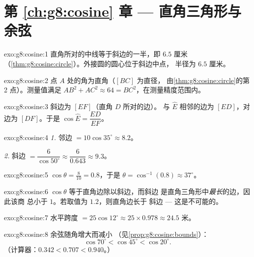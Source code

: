\section*{第 \ref{ch:g8:cosine} 章 --- 直角三角形与余弦}

\begin{solution}{exo:g8:cosine:1}
直角所对的中线等于斜边的一半，即 $6.5$ 厘米
（\cref{thm:g8:cosine:circle}）。外接圆的圆心位于斜边中点，
半径为 $6.5$ 厘米。
\end{solution}

\begin{solution}{exo:g8:cosine:2}
点 $A$ 处的角为直角（$[BC]$ 为直径，
由\cref{thm:g8:cosine:circle}的第 2 点）。测量值满足
$AB^2 + AC^2 \approx 64 = BC^2$，在测量精度范围内。
\end{solution}

\begin{solution}{exo:g8:cosine:3}
斜边为 $[EF]$（直角 $D$ 所对的边）。
与 $\widehat E$ 相邻的边为 $[ED]$，对边为 $[DF]$。于是
$\cos\widehat E = \dfrac{ED}{EF}$。
\end{solution}

\begin{solution}{exo:g8:cosine:4}
\emph{1.} 邻边 $= 10 \cos 35^\circ \approx 8.2$。

\emph{2.} 斜边 $= \dfrac{6}{\cos 50^\circ} \approx
\dfrac{6}{0.643} \approx 9.3$。
\end{solution}

\begin{solution}{exo:g8:cosine:5}
$\cos\theta = \frac{8}{10} = 0.8$，于是
$\theta = \cos^{-1}(0.8) \approx 37^\circ$。
\end{solution}

\begin{solution}{exo:g8:cosine:6}
$\cos\theta$ 等于直角边除以斜边，而斜边
是直角三角形中\emph{最长}的边，因此该商
总小于 $1$。若取值为 $1.2$，则直角边长于
斜边 --- 这是不可能的。
\end{solution}

\begin{solution}{exo:g8:cosine:7}
水平跨度 $= 25 \cos 12^\circ \approx 25 \times 0.978 \approx
24.5$ 米。
\end{solution}

\begin{solution}{exo:g8:cosine:8}
余弦随角增大而减小
（见\cref{prop:g8:cosine:bounds}）：
\[
\cos 70^\circ < \cos 45^\circ < \cos 20^\circ .
\]
（计算器：$0.342 < 0.707 < 0.940$。）
\end{solution}


